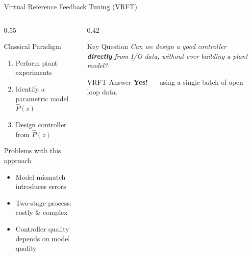 \documentclass[aspectratio=169]{beamer}
\newcommand{\highlight}[1]{{\color{accentblue}\textbf{#1}}}
\begin{document}
\begin{frame}{Virtual Reference Feedback Tuning (VRFT)}
  \begin{columns}[T]
    \begin{column}{0.55\textwidth}
      \begin{block}{Classical Paradigm}
        \begin{enumerate}
          \item Perform plant experiments
          \item Identify a parametric model $\hat{P}(z)$
          \item Design controller from $\hat{P}(z)$
        \end{enumerate}
      \end{block}
      \vspace{0.4em}
      \begin{alertblock}{Problems with this approach}
        \begin{itemize}
          \item Model mismatch introduces errors
          \item Two-stage process: costly \& complex
          \item Controller quality depends on model quality
        \end{itemize}
      \end{alertblock}
    \end{column}
    \begin{column}{0.42\textwidth}
      \begin{block}{Key Question}
        \centering\vspace{0.3em}
        \textit{Can we design a good controller \textbf{directly} from I/O data, without ever building a plant model?}
        \vspace{0.3em}
      \end{block}
      \vspace{0.4em}
      \begin{exampleblock}{VRFT Answer}
        \centering\vspace{0.2em}
        \highlight{Yes!} --- using a single batch of open-loop data.
        \vspace{0.2em}
      \end{exampleblock}
    \end{column}
  \end{columns}
\end{frame}
\end{document}
